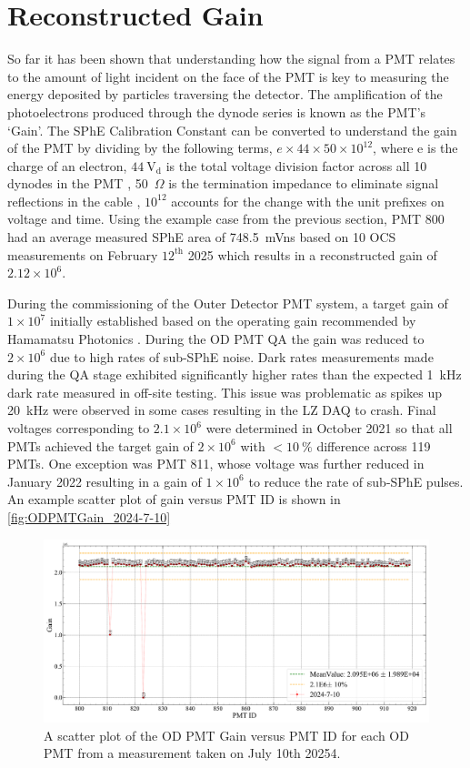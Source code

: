 \section{Reconstructed Gain}
So far it has been shown that understanding how the signal from a PMT relates to the amount of light incident on the face of the PMT is key to measuring the energy deposited by particles traversing the detector. The amplification of the photoelectrons produced through the dynode series is known as the PMT's `Gain'. The SPhE Calibration Constant can be converted to understand the gain of the PMT by dividing by the following terms, $e\times44\times50\times10^{12}$, where e is the charge of an electron, $44~\text{V}_{\text{d}}$ is the total voltage division factor across all 10 dynodes in the PMT \cite{HamamatsuR5912}, 50~$\Omega$ is the termination impedance to eliminate signal reflections in the cable \cite{LZ:2024bvw}, $10^{12}$ accounts for the change with the unit prefixes on voltage and time. Using the example case from the previous section, PMT 800 had an average measured SPhE area of 748.5~mVns based on 10 OCS measurements on February $12^{\text{th}}$ 2025 which results in a reconstructed gain of $2.12\times10^6$.

During the commissioning of the Outer Detector PMT system, a target gain of $1\times10^{7}$ initially established based on the operating gain recommended by Hamamatsu Photonics \cite{LZTDR,HamamatsuR5912}. During the OD PMT QA the gain was reduced to $2\times10^{6}$ due to high rates of sub-SPhE noise. Dark rates measurements made during the QA stage exhibited significantly higher rates than the expected 1~kHz dark rate measured in off-site testing. This issue was problematic as spikes up 20~kHz were observed in some cases resulting in the LZ DAQ to crash. Final voltages corresponding to $2.1\times10^{6}$ were determined in October 2021 so that all PMTs achieved the target gain of $2\times10^6$ with $<10~\%$ difference across 119 PMTs. One exception was PMT 811, whose voltage was further reduced in January 2022 resulting in a gain of $1\times10^6$ to reduce the rate of sub-SPhE pulses.
An example scatter plot of gain versus PMT ID is shown in \autoref{fig:ODPMTGain_2024-7-10}

\begin{figure}
    \centering
    \includegraphics[width=\textwidth]{figures/ODCommissioning/2024-7-10_ODPMT_Gain.pdf}
    \caption{A scatter plot of the OD PMT Gain versus PMT ID for each OD PMT from a measurement taken on July 10th 20254.}
    \label{fig:ODPMTGain_2024-7-10}
\end{figure}

